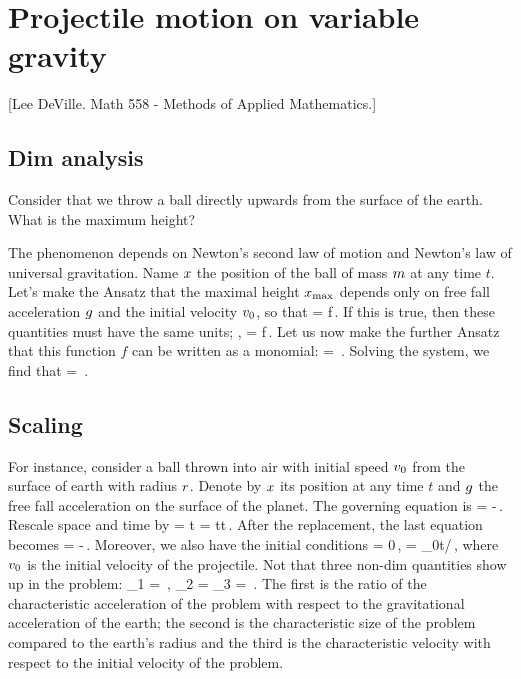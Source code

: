 \section{Projectile motion on variable gravity}

[Lee DeVille. Math 558 - Methods of Applied Mathematics.]


\subsection{Dim analysis}
Consider that we throw a ball directly upwards from the surface of the earth. What is the maximum height?

The phenomenon depends on Newton's second law of motion and Newton's law of universal gravitation. Name $x$ the position of the ball of mass $m$ at any time $t$. Let's make the Ansatz that the maximal height $x_\text{max}$ depends only on free fall acceleration $g$ and the initial velocity $v_0$, so that
\beq
\lpos{} = f\,.
\eeq
If this is true, then these quantities must have the same units; \ie,
\beq
\dim\lpos{} = \dim f\,.
\eeq
Let us now make the further Ansatz that this function $f$ can be written as a monomial:
\beq
\dim\lpos{} = \,.
\eeq
Solving the system, we find that
\beq
\lpos{} = \kdim{}\,.
\eeq


\subsection{Scaling}
For instance, consider a ball thrown into air with initial speed $v_0$ from the surface of earth with radius $r$. Denote by $x$ its position at any time $t$ and $g$ the free fall acceleration on the surface of the planet. The governing equation is
\beq
\ddt\lpos = -\,.
\eeq
Rescale space and time by
\beq
\lpos = \chpq\lpos\scpq\lpos\qquad{}\qquad
t = \chpq t\scpq t\,.
\eeq
After the replacement, the last equation becomes
\beq
{}\ddt{\scpq\lpos} = -\,.
\eeq
Moreover, we also have the initial conditions
\beq
\scpq\lpos{} = 0\,,\quad
\dt{\scpq\lpos} = \lvel_0\chpq t/\chpq\lpos\,,
\eeq
where $v_0$ is the initial velocity of the projectile. Not that three non-dim quantities show up in the problem:
\beq
\kdim_1 = \,,\quad
\kdim_2 = \dfrac{\chpq\lpos}{\radius}\quad{}\quad
\kdim_3 = \,.
\eeq
The first is the ratio of the characteristic acceleration of the problem with respect to the gravitational acceleration of the earth; the second is the characteristic size of the problem compared to the earth's radius and the third is the characteristic velocity with respect to the initial velocity of the problem.

